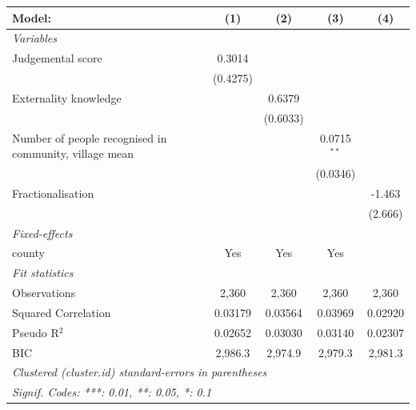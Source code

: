 
\begingroup
\centering
\begin{tabular}{lcccc}
   \tabularnewline \midrule \midrule
   Model:                                                 & (1)      & (2)      & (3)           & (4)\\  
   \midrule
   \emph{Variables}\\
   Judgemental score                                      & 0.3014   &          &               &   \\   
                                                          & (0.4275) &          &               &   \\   
   Externality knowledge                                  &          & 0.6379   &               &   \\   
                                                          &          & (0.6033) &               &   \\   
   Number of people recognised in community, village mean &          &          & 0.0715$^{**}$ &   \\   
                                                          &          &          & (0.0346)      &   \\   
   Fractionalisation                                      &          &          &               & -1.463\\   
                                                          &          &          &               & (2.666)\\   
   \midrule
   \emph{Fixed-effects}\\
   county                                                 & Yes      & Yes      & Yes           & \\  
   \midrule
   \emph{Fit statistics}\\
   Observations                                           & 2,360    & 2,360    & 2,360         & 2,360\\  
   Squared Correlation                                    & 0.03179  & 0.03564  & 0.03969       & 0.02920\\  
   Pseudo R$^2$                                           & 0.02652  & 0.03030  & 0.03140       & 0.02307\\  
   BIC                                                    & 2,986.3  & 2,974.9  & 2,979.3       & 2,981.3\\  
   \midrule \midrule
   \multicolumn{5}{l}{\emph{Clustered (cluster.id) standard-errors in parentheses}}\\
   \multicolumn{5}{l}{\emph{Signif. Codes: ***: 0.01, **: 0.05, *: 0.1}}\\
\end{tabular}
\par\endgroup


